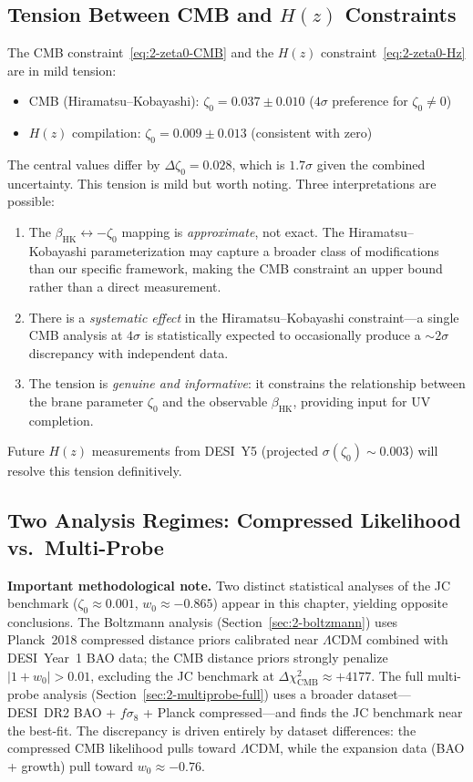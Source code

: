 \subsection{Tension Between CMB and $H(z)$ Constraints}
\label{sec:2-tension}

The CMB constraint~\eqref{eq:2-zeta0-CMB} and the $H(z)$ constraint~\eqref{eq:2-zeta0-Hz} are in mild tension:
\begin{itemize}
    \item CMB (Hiramatsu--Kobayashi): $\zeta_0 = 0.037 \pm 0.010$ ($4\sigma$ preference for $\zeta_0 \neq 0$)
    \item $H(z)$ compilation: $\zeta_0 = 0.009 \pm 0.013$ (consistent with zero)
\end{itemize}
The central values differ by $\Delta\zeta_0 = 0.028$, which is $1.7\sigma$ given the combined uncertainty. This tension is mild but worth noting. Three interpretations are possible:
\begin{enumerate}
    \item[(a)] The $\beta_\mathrm{HK} \leftrightarrow -\zeta_0$ mapping is \emph{approximate}, not exact. The Hiramatsu--Kobayashi parameterization may capture a broader class of modifications than our specific framework, making the CMB constraint an upper bound rather than a direct measurement.
    \item[(b)] There is a \emph{systematic effect} in the Hiramatsu--Kobayashi constraint---a single CMB analysis at $4\sigma$ is statistically expected to occasionally produce a $\sim 2\sigma$ discrepancy with independent data.
    \item[(c)] The tension is \emph{genuine and informative}: it constrains the relationship between the brane parameter $\zeta_0$ and the observable $\beta_\mathrm{HK}$, providing input for UV completion.
\end{enumerate}

Future $H(z)$ measurements from DESI~Y5 (projected $\sigma(\zeta_0) \sim 0.003$) will resolve this tension definitively.

\subsection{Two Analysis Regimes: Compressed Likelihood vs.\ Multi-Probe}
\label{sec:2-two-regimes}

\textbf{Important methodological note.} Two distinct statistical analyses of the JC benchmark ($\zeta_0 \approx 0.001$, $w_0 \approx -0.865$) appear in this chapter, yielding opposite conclusions. The Boltzmann analysis (Section~\ref{sec:2-boltzmann}) uses Planck~2018 compressed distance priors calibrated near $\Lambda$CDM combined with DESI~Year~1 BAO data; the CMB distance priors strongly penalize $|1+w_0| > 0.01$, excluding the JC benchmark at $\Delta\chi^2_\mathrm{CMB} \approx +4177$. The full multi-probe analysis (Section~\ref{sec:2-multiprobe-full}) uses a broader dataset---DESI~DR2 BAO + $f\sigma_8$ + Planck compressed---and finds the JC benchmark near the best-fit. The discrepancy is driven entirely by dataset differences: the compressed CMB likelihood pulls toward $\Lambda$CDM, while the expansion data (BAO + growth) pull toward $w_0 \approx -0.76$.

